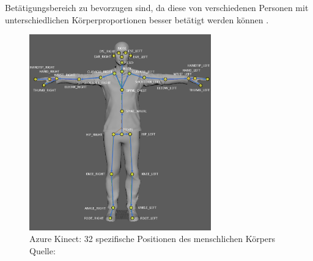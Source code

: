 Betätigungsbereich zu bevorzugen sind, da diese von verschiedenen Personen mit unterschiedlichen Körperproportionen besser betätigt werden können \cite{boll_mensch_2013}.

\begin{figure}[htb]
	\centering
	\includegraphics[width=0.70\textwidth]{images/loesungsweg/joint_hierarchy}
	\caption[Azure Kinect: 32 spezifische Positionen des menschlichen Körpers]{Azure Kinect: 32 spezifische Positionen des menschlichen Körpers \\Quelle: \cite{qm13_azure_joints_nodate}}
	\label{fig:joint_hierarchy}
\end{figure}
\FloatBarrier

